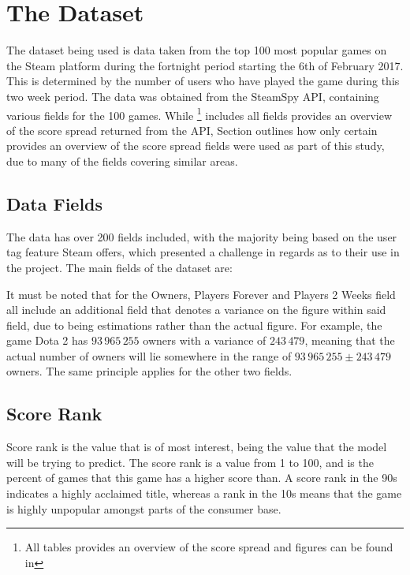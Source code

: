 \documentclass[dataset.tex]{subfiles}
\begin{document}
\section{The Dataset} %
\label{sec:dataset}
The dataset being used is data taken from the top 100 most popular games on the
Steam platform during the fortnight period starting the 6th of February 2017.
This is determined by the number of users who have played the game during this
two week period. The data was obtained from the SteamSpy API, containing various
fields for the 100 games. While  \footnote{All tables
provides an overview of the score spread and figures can be found in
} includes all fields provides an overview of the
score spread returned from the API, Section outlines
how only certain provides an overview of the score spread fields were used as
part of this study, due to many of the fields covering similar areas.

\subsection{Data Fields} %
\label{sub:data_fields}
The data has over 200 fields included, with the majority being based on the user
tag feature Steam offers, which presented a challenge in regards as to their use
in the project. The main fields of the dataset are:

It must be noted that for the Owners, Players Forever and Players 2 Weeks field
all include an additional field that denotes a variance on the figure within
said field, due to being estimations rather than the actual figure. For example,
the game Dota 2 has \(93\,965\,255\) owners with a variance of \(243\,479\),
meaning that the actual number of owners will lie somewhere in the range of
\(93\,965\,255 \pm 243\,479 \) owners. The same principle applies for the other
two fields.

\subsection{Score Rank} %
\label{sub:score_rank}
Score rank is the value that is of most interest, being the value that the model
will be trying to predict. The score rank is a value from 1 to 100, and is the
percent of games that this game has a higher score than. A score rank in the 90s
indicates a highly acclaimed title, whereas a rank in the 10s means that the
game is highly unpopular amongst parts of the consumer base. 
\end{document}
